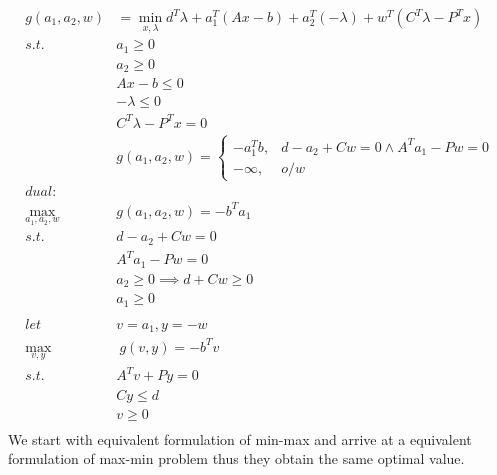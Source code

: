 \documentclass[12pt,letter]{article}
\begin{document}
\begin{enumerate}
\begin{itemize}
\begin{align*}
      g(a_1,a_2,w) &= \min_{x,\lambda} d^T\lambda + a_1^T(Ax-b)+a_2^T(-\lambda) + w^T(C^T\lambda-P^Tx)\\
      s.t.\ &a_1 \geq 0\\
                       &a_2 \geq 0\\
      &Ax-b \leq 0\\
                       &-\lambda \leq 0\\
                       &C^T\lambda - P^Tx = 0\\
      &g(a_1,a_2,w) =
                     \begin{cases}
                       -a_1^Tb , & d-a_2+Cw=0 \wedge A^Ta_1-Pw=0\\
                       -\infty, & o/w
                     \end{cases}\\
      dual:&\\
      \max_{a_1,a_2,w} & g(a_1,a_2,w) = -b^Ta_1\\
      s.t.\ & d-a_2+Cw=0\\
                      &A^Ta_1-Pw=0\\
                      &a_2 \geq 0 \implies d+Cw \geq 0\\
                      &a_1 \geq 0\\
      \\
      let\ &v = a_1, y = -w\\
      \max_{v,y}&\ g(v,y) = -b^Tv\\
      s.t.\ &A^Tv+Py=0\\
                      &Cy \leq d\\
                      &v \geq 0\\
    \end{align*}
    We start with equivalent formulation of min-max and arrive at a equivalent formulation of max-min problem thus they obtain the same optimal value.
  \end{itemize}
  
\end{enumerate}
\end{document}
